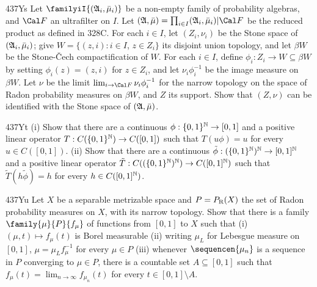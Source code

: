 {\spheader 437Ys
Let $\familyiI{(\frak A_i,\bar\mu_i)}$ be a non-empty family of probability
algebras, and $\Cal F$ an ultrafilter on $I$.   Let
$(\frak A,\bar\mu)=\prod_{i\in I}(\frak A_i,\bar\mu_i)|\Cal F$
be the reduced product as defined in 328C.   For each $i\in I$, let
$(Z_i,\nu_i)$ be the Stone space of $(\frak A_i,\bar\mu_i)$;
give $W=\{(z,i):i\in I$, $z\in Z_i\}$ its disjoint union topology, and let
$\beta W$ be the Stone-\v{C}ech compactification of $W$.   For each
$i\in I$, define $\phi_i:Z_i\to W\subseteq\beta W$ by setting
$\phi_i(z)=(z,i)$ for $z\in Z_i$, and let $\nu_i\phi_i^{-1}$
be the image measure on $\beta W$.
Let $\nu$ be the limit $\lim_{i\to\Cal F}\nu_i\phi_i^{-1}$ for the narrow
topology on the space of Radon probability measures on $\beta W$,
and $Z$ its support.   Show that
$(Z,\nu)$ can be identified with the Stone space of $(\frak A,\bar\mu)$.

\spheader 437Yt (i) Show that there are a continuous
$\phi:\{0,1\}^{\Bbb N}\to[0,1]$ and a positive linear operator
$T:C(\{0,1\}^{\Bbb N})\to C([0,1])$ such that $T(u\phi)=u$ for every
$u\in C([0,1])$.      (ii) Show that there are a continuous
$\tilde\phi:(\{0,1\}^{\Bbb N})^{\Bbb N}\to[0,1]^{\Bbb N}$ and a positive
linear operator
$\tilde T:C((\{0,1\}^{\Bbb N})^{\Bbb N})\to C([0,1]^{\Bbb N})$ such that
$\tilde T(h\tilde\phi)=h$ for every
$h\in C([0,1]^{\Bbb N})$.   

\spheader 437Yu Let $X$ be a separable metrizable space
and $P=P_{\text{R}}(X)$ the set of Radon probability measures on $X$, with its
narrow topology.
Show that there is a family $\family{\mu}{P}{f_{\mu}}$ of
functions from
$[0,1]$ to $X$ such that (i) $(\mu,t)\mapsto f_{\mu}(t)$ is Borel
measurable (ii) writing $\mu_L$ for Lebesgue measure on
$[0,1]$, $\mu=\mu_Lf_{\mu}^{-1}$ for every $\mu\in P$ (iii) whenever
$\sequencen{\mu_n}$ is a sequence in $P$ converging
to $\mu\in P$, there is a countable set $A\subseteq[0,1]$ such that
$f_{\mu}(t)=\lim_{n\to\infty}f_{\mu_n}(t)$ for every
$t\in[0,1]\setminus A$.   

}
